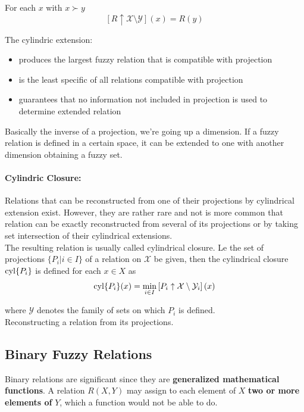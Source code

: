 For each $x$ with $x \succ y$ 
$$ [R \uparrow \mathcal{X} \setminus \mathcal{Y}] (x) = R(y) $$

The cylindric extension: 
\begin{itemize}
	\item produces the largest fuzzy relation that is compatible with projection
	\item is the least specific of all relations compatible with projection
	\item guarantees that no information not included in projection is used to determine extended relation
\end{itemize}

Basically the inverse of a projection, we're going up a dimension. If a fuzzy relation is defined in a certain space, it can be extended to one with another dimension obtaining a fuzzy set.\\

\paragraph{Cylindric Closure:} Relations that can be reconstructed from one of their projections by cylindrical extension exist. However, they are rather rare and not is more common that relation can be exactly reconstructed from several of its projections or by taking set intersection of their cylindrical extensions. \\

The resulting relation is usually called cylindrical closure. Le the set of projections $\{P_i | i \in I\}$ of a relation on $\mathcal{X}$ be given, then the cylindrical closure $\operatorname*{cyl}\{P_i\}$ is defined for each $x \in X$ as
$$ \operatorname*{cyl} \{P_i\} (x) = \min_{i \in I} \left[P_i \uparrow \mathcal{X} \setminus \mathcal{Y}_i \right] (x) $$

where $\mathcal{Y}$ denotes the family of sets on which $P_i$ is defined.\\

Reconstructing a relation from its projections.\\

\newpage


\subsection{Binary Fuzzy Relations}

Binary relations are significant since they are \textbf{generalized mathematical functions}. A relation $R(X,Y)$ may assign to each element of $X$ \textbf{two or more elements of} $Y$, which a function would not be able to do.\\

